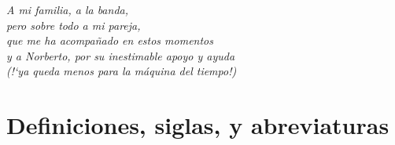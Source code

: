 \documentclass[a4paper,oneside,12pt,titlepage,bibliography=totoc]{scrreport}
\newcommand{\settttsize}[1]{\def\ttsize{#1}}%
\newcommand\blankpage{%
    \null
    \thispagestyle{empty}%
    \addtocounter{page}{-1}%
    \newpage}
\begin{document}
\settttsize{\footnotesize}
\ActivateVerbatimLigatures




\thispagestyle{empty}
\vspace*{\fill}
\begin{flushright}
  \textit{A mi familia, a la banda,\\
    pero sobre todo a mi pareja, \\
    que me ha acompañado en estos momentos \\
    y a Norberto, por su inestimable apoyo y ayuda \\
    (!`ya queda menos para la máquina del tiempo!)}
\end{flushright}
\vspace*{\fill}

\newpage
\afterpage{\blankpage}
\pagestyle{short}
\tableofcontents
\listoffigures
\listoftables

\newpage
\pagestyle{long}

% 


\chapter*{Definiciones, siglas, y abreviaturas}


\newpage
{}

\end{document}
